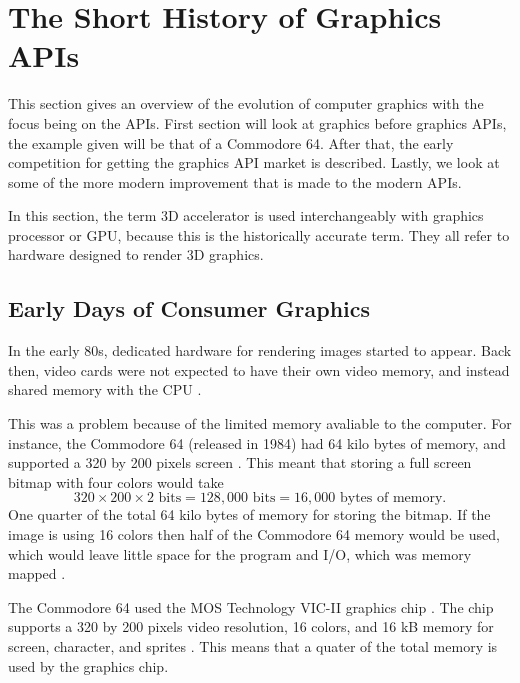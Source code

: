 \section{The Short History of Graphics \acs{API}s}\label{sec:short_history}
\begin{sectionmeta}
	This section gives an overview of the evolution of computer graphics with the focus being on the \glspl{API}.
	First section will look at graphics before graphics \glspl{API}, the example given will be that of a Commodore 64.
	After that, the early competition for getting the graphics \gls{API} market is described.
	Lastly, we look at some of the more modern improvement that is made to the modern \glspl{API}.
	
	In this section, the term 3D accelerator is used interchangeably with graphics processor or \gls{GPU}, because this is the historically accurate term. 
	They all refer to hardware designed to render 3D graphics.
\end{sectionmeta}

\subsection{Early Days of Consumer Graphics}

In the early 80s, dedicated hardware for rendering images started to appear.
Back then, video cards were not expected to have their own video memory, and instead shared memory with the \gls{CPU} \cite{wikipedia????shared}.

This was a problem because of the limited memory avaliable to the computer.
For instance, the Commodore 64 (released in 1984) had 64 kilo bytes of memory, and supported a 320 by 200 pixels screen \cite{commodore1983commodore}.
This meant that storing a full screen bitmap with four colors would take $$320\times 200\times 2 \text{ bits} = 128,000 \text{ bits} = 16,000 \text{ bytes of memory.}$$
One quarter of the total 64 kilo bytes of memory for storing the bitmap.
If the image is using 16 colors then half of the Commodore 64 memory would be used, which would leave little space for the program and I/O, which was memory mapped \cite{commodore1983commodore}.

The Commodore 64 used the MOS Technology VIC-II graphics chip \cite{commodore1983commodore}.
The chip supports a 320 by 200 pixels video resolution, 16 colors, and 16 kB memory for screen, character, and sprites \cite{commodore1983commodore}.
This means that a quater of the total memory is used by the graphics chip.

